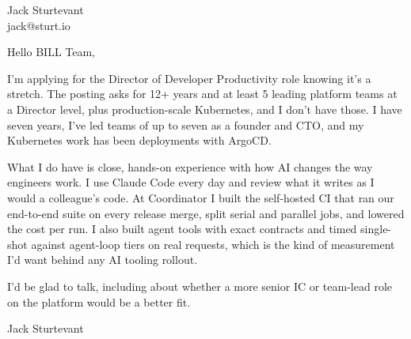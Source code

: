\documentclass[11pt]{article}
\begin{document}
\raggedright

{\namefont\fontsize{20pt}{24pt}\selectfont Jack Sturtevant}\\[-0.3em]
jack@sturt.io

\vspace{1.2em}

Hello BILL Team,

I'm applying for the Director of Developer Productivity role knowing it's a stretch. The posting asks for 12+ years and at least 5 leading platform teams at a Director level, plus production-scale Kubernetes, and I don't have those. I have seven years, I've led teams of up to seven as a founder and CTO, and my Kubernetes work has been deployments with ArgoCD.

What I do have is close, hands-on experience with how AI changes the way engineers work. I use Claude Code every day and review what it writes as I would a colleague's code. At Coordinator I built the self-hosted CI that ran our end-to-end suite on every release merge, split serial and parallel jobs, and lowered the cost per run. I also built agent tools with exact contracts and timed single-shot against agent-loop tiers on real requests, which is the kind of measurement I'd want behind any AI tooling rollout.

I'd be glad to talk, including about whether a more senior IC or team-lead role on the platform would be a better fit.

\vspace{0.6em}
Jack Sturtevant
\end{document}
